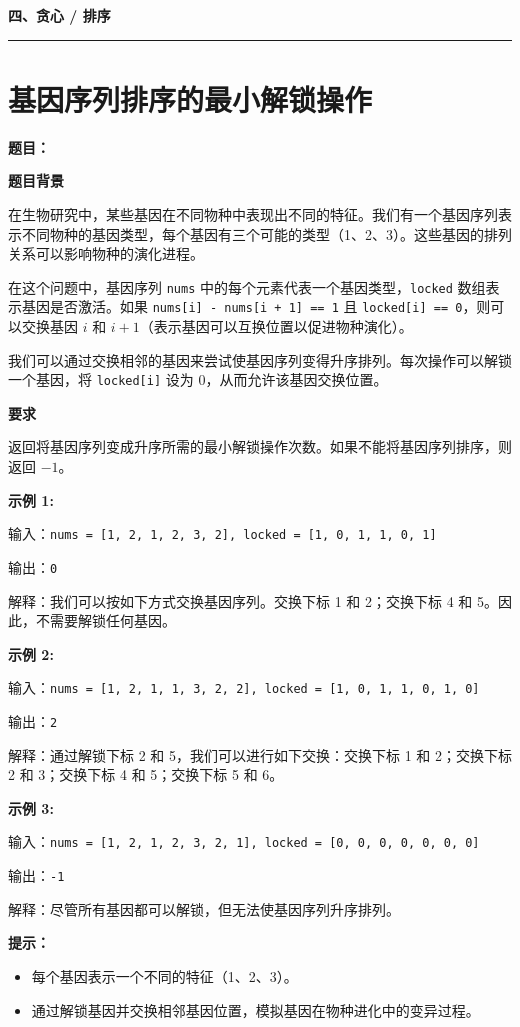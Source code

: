 \documentclass[12pt, a4paper]{article}
\newcommand{\category}[1]{%
  \vspace{1.2cm}
  {\noindent\Large\bfseries #1}
  \vspace{0.2em}\par
  \noindent\rule{\textwidth}{0.8pt}
  \vspace{0.2em}
}
\begin{document}
\category{四、贪心 / 排序}

\section{基因序列排序的最小解锁操作}

\noindent\textbf{题目：}

\textbf{题目背景}

在生物研究中，某些基因在不同物种中表现出不同的特征。我们有一个基因序列表示不同物种的基因类型，每个基因有三个可能的类型（1、2、3）。这些基因的排列关系可以影响物种的演化进程。

在这个问题中，基因序列 \texttt{nums} 中的每个元素代表一个基因类型，\texttt{locked} 数组表示基因是否激活。如果 \texttt{nums[i] - nums[i + 1] == 1} 且 \texttt{locked[i] == 0}，则可以交换基因 $i$ 和 $i + 1$（表示基因可以互换位置以促进物种演化）。

我们可以通过交换相邻的基因来尝试使基因序列变得升序排列。每次操作可以解锁一个基因，将 \texttt{locked[i]} 设为 0，从而允许该基因交换位置。

\textbf{要求}

返回将基因序列变成升序所需的最小解锁操作次数。如果不能将基因序列排序，则返回 $-1$。

\textbf{示例 1:}

输入：\texttt{nums = [1, 2, 1, 2, 3, 2], locked = [1, 0, 1, 1, 0, 1]}

输出：\texttt{0}

解释：我们可以按如下方式交换基因序列。交换下标 1 和 2；交换下标 4 和 5。因此，不需要解锁任何基因。

\textbf{示例 2:}

输入：\texttt{nums = [1, 2, 1, 1, 3, 2, 2], locked = [1, 0, 1, 1, 0, 1, 0]}

输出：\texttt{2}

解释：通过解锁下标 2 和 5，我们可以进行如下交换：交换下标 1 和 2；交换下标 2 和 3；交换下标 4 和 5；交换下标 5 和 6。

\textbf{示例 3:}

输入：\texttt{nums = [1, 2, 1, 2, 3, 2, 1], locked = [0, 0, 0, 0, 0, 0, 0]}

输出：\texttt{-1}

解释：尽管所有基因都可以解锁，但无法使基因序列升序排列。

\textbf{提示：}
\begin{itemize}[leftmargin=2em]
  \item 每个基因表示一个不同的特征（1、2、3）。
  \item 通过解锁基因并交换相邻基因位置，模拟基因在物种进化中的变异过程。
\end{itemize}
\end{document}
